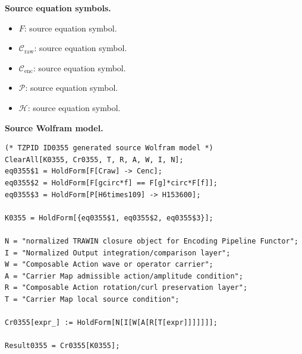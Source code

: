 \begin{minipage}[t]{0.49\linewidth}
\begingroup
\small
\raggedright
\textbf{Source equation symbols.}\par
\begin{itemize}[leftmargin=1.35em,itemsep=1pt,topsep=1pt,parsep=0pt]
    \item $F$: source equation symbol.
    \item $\mathcal{C}_{\mathrm{raw}}$: source equation symbol.
    \item $\mathcal{C}_{\mathrm{enc}}$: source equation symbol.
    \item $\mathcal{P}$: source equation symbol.
    \item $\mathcal{H}$: source equation symbol.
\end{itemize}
\endgroup
\end{minipage}\hfill
\begin{minipage}[t]{0.47\linewidth}
\begingroup
\scriptsize
\raggedright
\textbf{Source Wolfram model.}\par
\begin{Verbatim}[fontsize=\tiny,breaklines=true,breakanywhere=true]
(* TZPID ID0355 generated source Wolfram model *)
ClearAll[K0355, Cr0355, T, R, A, W, I, N];
eq0355$1 = HoldForm[F[Craw] -> Cenc];
eq0355$2 = HoldForm[F[gcirc*f] == F[g]*circ*F[f]];
eq0355$3 = HoldForm[P[H6times109] -> H153600];

K0355 = HoldForm[{eq0355$1, eq0355$2, eq0355$3}];

N = "normalized TRAWIN closure object for Encoding Pipeline Functor";
I = "Normalized Output integration/comparison layer";
W = "Composable Action wave or operator carrier";
A = "Carrier Map admissible action/amplitude condition";
R = "Composable Action rotation/curl preservation layer";
T = "Carrier Map local source condition";

Cr0355[expr_] := HoldForm[N[I[W[A[R[T[expr]]]]]]];

Result0355 = Cr0355[K0355];
\end{Verbatim}
\endgroup
\end{minipage}

